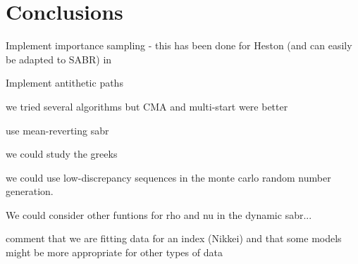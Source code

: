 
\chapter{Conclusions}
\label{chapter:conclusions}
Implement importance sampling - this has been done for Heston (and can easily be adapted to SABR) in \cite{Stilger}

Implement antithetic paths

we tried several algorithms but CMA and multi-start were better


use mean-reverting sabr

we could study the greeks

we could use low-discrepancy sequences in the monte carlo random number generation.

We could consider other funtions for rho and nu in the dynamic sabr...

comment that we are fitting data for an index (Nikkei) and that some models might be more appropriate for other types of data